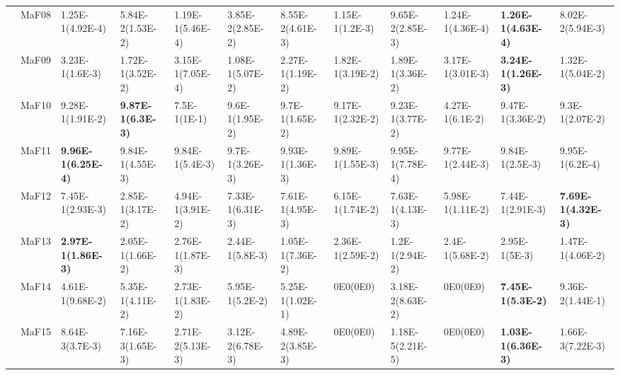 \documentclass[]{article}
\begin{document}
\begin{landscape}
\begin{table}
\begin{footnotesize}
\begin{tabular}{|l|l|l|l|l|l|l|l|l|l|l|l|}
 & MaF08 & \cellcolor{gray95} 1.25E-1(4.92E-4) & 5.84E-2(1.53E-2) & \cellcolor{gray95} 1.19E-1(5.46E-4) & 3.85E-2(2.85E-2) & 8.55E-2(4.61E-3) & 1.15E-1(1.2E-3) & 9.65E-2(2.85E-3) & \cellcolor{gray95} 1.24E-1(4.36E-4) & \cellcolor{gray95} {\bf 1.26E-1(4.63E-4)} & 8.02E-2(5.94E-3)\\
 & MaF09 & \cellcolor{gray95} 3.23E-1(1.6E-3) & 1.72E-1(3.52E-2) & \cellcolor{gray95} 3.15E-1(7.05E-4) & 1.08E-1(5.07E-2) & 2.27E-1(1.19E-2) & 1.82E-1(3.19E-2) & 1.89E-1(3.36E-2) & \cellcolor{gray95} 3.17E-1(3.01E-3) & \cellcolor{gray95} {\bf 3.24E-1(1.26E-3)} & 1.32E-1(5.04E-2)\\
 & MaF10 & 9.28E-1(1.91E-2) & \cellcolor{gray95} {\bf 9.87E-1(6.3E-3)} & 7.5E-1(1E-1) & \cellcolor{gray95} 9.6E-1(1.95E-2) & \cellcolor{gray95} 9.7E-1(1.65E-2) & 9.17E-1(2.32E-2) & 9.23E-1(3.77E-2) & 4.27E-1(6.1E-2) & 9.47E-1(3.36E-2) & 9.3E-1(2.07E-2)\\
 & MaF11 & \cellcolor{gray95} {\bf 9.96E-1(6.25E-4)} & 9.84E-1(4.55E-3) & 9.84E-1(5.4E-3) & 9.7E-1(3.26E-3) & \cellcolor{gray95} 9.93E-1(1.36E-3) & 9.89E-1(1.55E-3) & \cellcolor{gray95} 9.95E-1(7.78E-4) & 9.77E-1(2.44E-3) & 9.84E-1(2.5E-3) & \cellcolor{gray95} 9.95E-1(6.2E-4)\\
 & MaF12 & 7.45E-1(2.93E-3) & 2.85E-1(3.17E-2) & 4.94E-1(3.91E-2) & 7.33E-1(6.31E-3) & \cellcolor{gray95} 7.61E-1(4.95E-3) & 6.15E-1(1.74E-2) & \cellcolor{gray95} 7.63E-1(4.13E-3) & 5.98E-1(1.11E-2) & 7.44E-1(2.91E-3) & \cellcolor{gray95} {\bf 7.69E-1(4.32E-3)}\\
 & MaF13 & \cellcolor{gray95} {\bf 2.97E-1(1.86E-3)} & 2.05E-1(1.66E-2) & \cellcolor{gray95} 2.76E-1(1.87E-3) & 2.44E-1(5.8E-3) & 1.05E-1(7.36E-2) & 2.36E-1(2.59E-2) & 1.2E-1(2.94E-2) & 2.4E-1(5.68E-2) & \cellcolor{gray95} 2.95E-1(5E-3) & 1.47E-1(4.06E-2)\\
 & MaF14 & 4.61E-1(9.68E-2) & \cellcolor{gray95} 5.35E-1(4.11E-2) & 2.73E-1(1.83E-2) & \cellcolor{gray95} 5.95E-1(5.2E-2) & \cellcolor{gray95} 5.25E-1(1.02E-1) & 0E0(0E0) & 3.18E-2(8.63E-2) & 0E0(0E0) & \cellcolor{gray95} {\bf 7.45E-1(5.3E-2)} & 9.36E-2(1.44E-1)\\
 & MaF15 & 8.64E-3(3.7E-3) & 7.16E-3(1.65E-3) & \cellcolor{gray95} 2.71E-2(5.13E-3) & \cellcolor{gray95} 3.12E-2(6.78E-3) & \cellcolor{gray95} 4.89E-2(3.85E-3) & 0E0(0E0) & 1.18E-5(2.21E-5) & 0E0(0E0) & \cellcolor{gray95} {\bf 1.03E-1(6.36E-3)} & 1.66E-3(7.22E-3)\\
\hline


\end{tabular}
\end{footnotesize}
\end{table}
\end{landscape}
\end{document}
